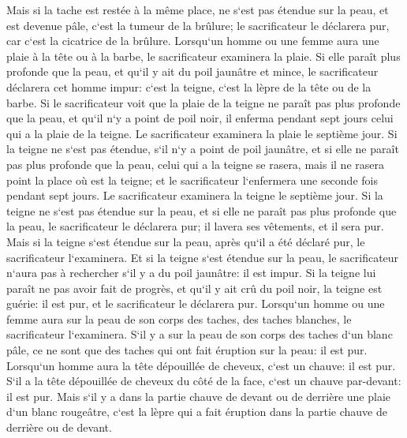 \verse Mais si la tache est restée à la même place, ne s`est pas étendue sur la peau, et est devenue pâle, c`est la tumeur de la brûlure; le sacrificateur le déclarera pur, car c`est la cicatrice de la brûlure. 
\verse Lorsqu`un homme ou une femme aura une plaie à la tête ou à la barbe, 
\verse le sacrificateur examinera la plaie. Si elle paraît plus profonde que la peau, et qu`il y ait du poil jaunâtre et mince, le sacrificateur déclarera cet homme impur: c`est la teigne, c`est la lèpre de la tête ou de la barbe. 
\verse Si le sacrificateur voit que la plaie de la teigne ne paraît pas plus profonde que la peau, et qu`il n`y a point de poil noir, il enferma pendant sept jours celui qui a la plaie de la teigne. 
\verse Le sacrificateur examinera la plaie le septième jour. Si la teigne ne s`est pas étendue, s`il n`y a point de poil jaunâtre, et si elle ne paraît pas plus profonde que la peau, 
\verse celui qui a la teigne se rasera, mais il ne rasera point la place où est la teigne; et le sacrificateur l`enfermera une seconde fois pendant sept jours. 
\verse Le sacrificateur examinera la teigne le septième jour. Si la teigne ne s`est pas étendue sur la peau, et si elle ne paraît pas plus profonde que la peau, le sacrificateur le déclarera pur; il lavera ses vêtements, et il sera pur. 
\verse Mais si la teigne s`est étendue sur la peau, après qu`il a été déclaré pur, le sacrificateur l`examinera. 
\verse Et si la teigne s`est étendue sur la peau, le sacrificateur n`aura pas à rechercher s`il y a du poil jaunâtre: il est impur. 
\verse Si la teigne lui paraît ne pas avoir fait de progrès, et qu`il y ait crû du poil noir, la teigne est guérie: il est pur, et le sacrificateur le déclarera pur. 
\verse Lorsqu`un homme ou une femme aura sur la peau de son corps des taches, des taches blanches, 
\verse le sacrificateur l`examinera. S`il y a sur la peau de son corps des taches d`un blanc pâle, ce ne sont que des taches qui ont fait éruption sur la peau: il est pur. 
\verse Lorsqu`un homme aura la tête dépouillée de cheveux, c`est un chauve: il est pur. 
\verse S`il a la tête dépouillée de cheveux du côté de la face, c`est un chauve par-devant: il est pur. 
\verse Mais s`il y a dans la partie chauve de devant ou de derrière une plaie d`un blanc rougeâtre, c`est la lèpre qui a fait éruption dans la partie chauve de derrière ou de devant. 
